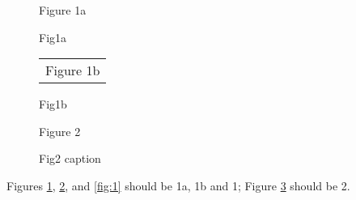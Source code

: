 \documentclass{article}
\begin{document}
\begin{figure*}
  \begin{subfigure}{0.3\textwidth}
    Figure 1a
    \caption{Fig1a}
    \label{fig:1a}
  \end{subfigure}
  \hfill
  \begin{subfigure}{0.5\textwidth}
\begin{tabularx}{0.5\textwidth}{r}
Figure 1b
\end{tabularx}
    \caption{Fig1b}
    \label{fig:1b}
  \end{subfigure}
  \caption{Fig1}
  \label{fig:1}
\end{figure*}

\begin{figure}
Figure 2
\caption{Fig2 caption}
\label{fig:2}
\end{figure}

Figures \ref{fig:1a}, \ref{fig:1b}, and \ref{fig:1} should be 1a, 1b
and 1; Figure \ref{fig:2} should be 2.
\end{document}

